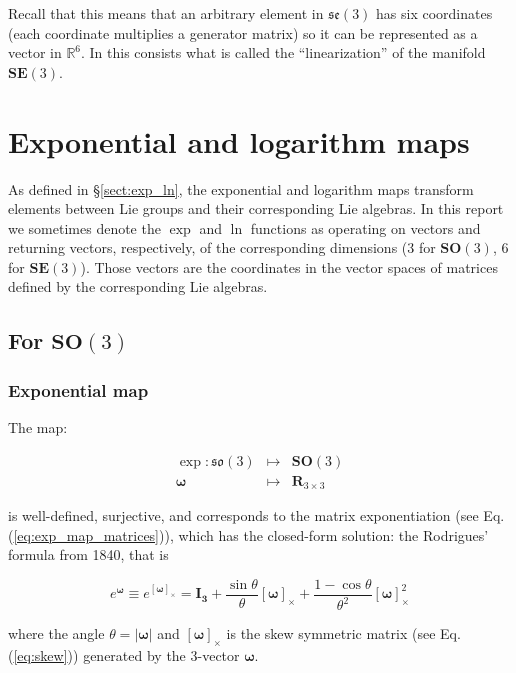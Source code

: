 \documentclass[a4paper,11pt]{report}
\newcommand{\W}{{\bm{\omega}}}
\begin{document}
Recall that this means that an arbitrary element in $\mathfrak{se}(3)$ 
has six coordinates (each coordinate multiplies a generator matrix) 
so it can be represented as a vector in $\mathbb{R}^6$.
In this consists what is called the ``linearization'' of the manifold 
$\mathbf{SE}(3)$.


\section{Exponential and logarithm maps}

As defined in \S\ref{sect:exp_ln}, the exponential and logarithm maps 
transform elements between Lie groups and their corresponding 
Lie algebras. 
In this report we sometimes denote the $\exp$ and $\ln$ functions 
as operating on vectors and returning vectors, respectively, 
of the corresponding dimensions (3 for $\mathbf{SO}(3)$, 6 for $\mathbf{SE}(3)$). 
Those vectors are the coordinates in the 
vector spaces of matrices defined by the corresponding Lie algebras.


\subsection{For $\mathbf{SO}(3)$}

\subsubsection{Exponential map}

The map:

\begin{eqnarray}
  \exp: \mathfrak{so}(3) & \mapsto & \mathbf{SO}(3) \\
           \W & \mapsto & \mathbf{R}_{3\times 3}
\end{eqnarray}

\noindent is well-defined, surjective, and 
corresponds to the matrix exponentiation (see Eq.(\ref{eq:exp_map_matrices})), 
which has the closed-form solution: 
the  Rodrigues' formula from 1840, that is

\begin{equation}
\label{eq:rodrigues}
  e^ { \W } \equiv  e^ { [\W]_\times } = 
\mathbf{I_3}
+ \frac{\sin \theta}{\theta} [\W]_\times 
+ \frac{1- \cos \theta}{\theta^2} [\W]^2_\times
\end{equation}

\noindent where 
the angle $\theta = |\W|$ and 
$[\W]_\times$ is the skew symmetric matrix (see Eq.(\ref{eq:skew}))
generated by the 3-vector $\W$.
\end{document}
